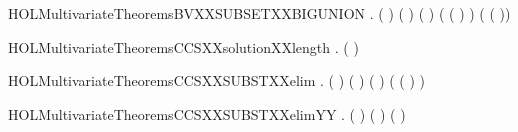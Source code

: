 \begin{SaveVerbatim}{HOLMultivariateTheoremsBVXXSUBSETXXBIGUNION}
\HOLTokenTurnstile{} \HOLSymConst{\HOLTokenForall{}}  .
         \HOLSymConst{\HOLTokenConj{}} (  \HOLSymConst{=}  ) \HOLSymConst{\HOLTokenConj{}}
        ( ) ( ) \HOLSymConst{\HOLTokenImp{}}
        ( ( \HOLSymConst{\HOLTokenMapto{}} ) ) \HOLConst{\HOLTokenSubset{}}
         \HOLConst{\HOLTokenUnion{}}  (  ( ))
\end{SaveVerbatim}
\newcommand{\HOLMultivariateTheoremsBVXXSUBSETXXBIGUNION}{\UseVerbatim{HOLMultivariateTheoremsBVXXSUBSETXXBIGUNION}}
\begin{SaveVerbatim}{HOLMultivariateTheoremsCCSXXsolutionXXlength}
\HOLTokenTurnstile{} \HOLSymConst{\HOLTokenForall{}}   .
          \HOLSymConst{\HOLTokenConj{}}      \HOLSymConst{\HOLTokenImp{}}
       (  \HOLSymConst{=}  )
\end{SaveVerbatim}
\newcommand{\HOLMultivariateTheoremsCCSXXsolutionXXlength}{\UseVerbatim{HOLMultivariateTheoremsCCSXXsolutionXXlength}}
\begin{SaveVerbatim}{HOLMultivariateTheoremsCCSXXSUBSTXXelim}
\HOLTokenTurnstile{} \HOLSymConst{\HOLTokenForall{}}  .
        ( ) ( ) \HOLSymConst{\HOLTokenConj{}} (  \HOLSymConst{=}  ) \HOLSymConst{\HOLTokenImp{}}
       ( ( \HOLSymConst{\HOLTokenMapto{}} )  \HOLSymConst{=} )
\end{SaveVerbatim}
\newcommand{\HOLMultivariateTheoremsCCSXXSUBSTXXelim}{\UseVerbatim{HOLMultivariateTheoremsCCSXXSUBSTXXelim}}
\begin{SaveVerbatim}{HOLMultivariateTheoremsCCSXXSUBSTXXelimYY}
\HOLTokenTurnstile{} \HOLSymConst{\HOLTokenForall{}} .  ( ) ( ) \HOLSymConst{\HOLTokenImp{}} (   \HOLSymConst{=} )
\end{SaveVerbatim}
